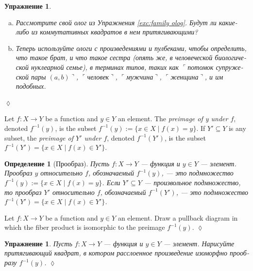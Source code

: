 \documentclass[a4paper]{book}
\def\tn{\textnormal}
\def\to{\rightarrow}
\def\taking{\colon}
\def\ss{\subseteq}
\def\|{{\;|\;}}
\def\m1{{-1}}
\newcommand{\fakebox}[1]{\tn{$\ulcorner$#1$\urcorner$}}
\theoremstyle{myth}
\newtheorem{excENG}[envENG]{\begin{english}Exercise\end{english}}
\newtheorem{definitionENG}[envENG]{\begin{english}Definition\end{english}}
\newenvironment{exerciseENG}{\begin{excENG}}{\hspace*{\fill}$\lozenge$\end{excENG}}
\newtheorem{excRUS}[envRUS]{Упражнение}
\newtheorem{definitionRUS}[envRUS]{Определение}
\newenvironment{exerciseRUS}{\begin{excRUS}}{\hspace*{\fill}$\lozenge$\end{excRUS}}
\def\sexc{\begin{enumerate}[a.)]\setlength{\itemsep}{.1cm}\setlength{\parskip}{.1cm}\item}
\def\next{\item}
\def\endsexc{\end{enumerate}}
\begin{document}
\begin{russian}
\begin{exerciseRUS}~
\sexc Рассмотрите свой олог из Упражнения \ref{exc:family olog}. Будут ли какие-либо из коммутативных квадратов в нем притягивающими? 
\next Теперь используйте ологи с произведениями и пулбеками, чтобы определить, что такое брат, и что такое сестра (опять же, в человеческой биологической нуклеарной семье), в терминах типов, таких как \fakebox{потомок супружеской пары $(a,b)$}, \fakebox{человек}, \fakebox{мужчина}, \fakebox{женщина}, и им подобных.
\endsexc
\end{exerciseRUS}

\begin{definitionENG}[Preimage]\label{def:preimage}
Let $f\taking X\to Y$ be a function and $y\in Y$ an element. The {\em preimage of y under $f$}, denoted $f^\m1(y)$,\index{a symbol!$f^\m1$} is  the subset $f^\m1(y):=\{x\in X\|f(x)=y\}$. If $Y'\ss Y$ is any subset, the {\em preimage of $Y'$ under $f$}, denoted $f^\m1(Y')$, is the subset $f^\m1(Y')=\{x\in X\|f(x)\in Y'\}$.
\end{definitionENG}

\begin{definitionRUS}[Прообраз]\label{def:preimage}
Пусть $f\taking X\to Y$ — функция и $y\in Y$ — элемент. {\em Прообраз $y$ относительно $f$}, обозначаемый $f^\m1(y)$,\index{символ!$f^\m1$} — это подмножество $f^\m1(y):=\{x\in X\|f(x)=y\}$. Если $Y'\ss Y$ — произвольное подмножество, то {\em прообраз $Y'$ относительно $f$}, обозначаемый $f^\m1(Y')$, — это подмножество $f^\m1(Y')=\{x\in X\|f(x)\in Y'\}$.
\end{definitionRUS}

\begin{exerciseENG}
Let $f\taking X\to Y$ be a function and $y\in Y$ an element. Draw a pullback diagram in which the fiber product is isomorphic to the preimage $f^\m1(y)$.
\end{exerciseENG}

\begin{exerciseRUS}
Пусть $f\taking X\to Y$ — функция и $y\in Y$ — элемент. Нарисуйте притягивающий квадрат, в котором расслоенное произведение изоморфно прообразу $f^\m1(y)$. 
\end{exerciseRUS}


\end{russian}
\end{document}
